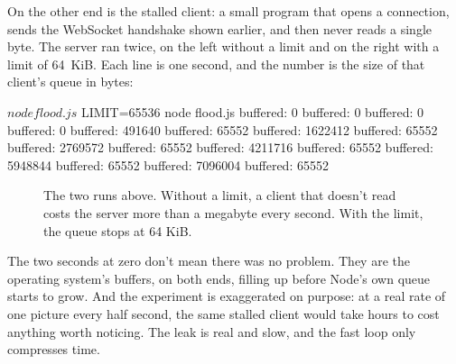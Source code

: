 On the other end is the stalled client: a small program that opens a
connection, sends the WebSocket handshake shown earlier, and then never
reads a single byte. The server ran twice, on the left without a limit and on
the right with a limit of 64~KiB. Each line is one second, and the number is
the size of that client's queue in bytes:

\begin{terminal}
$ node flood.js                    $ LIMIT=65536 node flood.js
buffered: 0                        buffered: 0
buffered: 0                        buffered: 0
buffered: 491640                   buffered: 65552
buffered: 1622412                  buffered: 65552
buffered: 2769572                  buffered: 65552
buffered: 4211716                  buffered: 65552
buffered: 5948844                  buffered: 65552
buffered: 7096004                  buffered: 65552
\end{terminal}

\begin{figure}[htbp]
\centering
{}
\caption{The two runs above. Without a limit, a client that doesn't read costs
the server more than a megabyte every second. With the limit, the queue stops at
64 KiB.}
\end{figure}

The two seconds at zero don't mean there was no problem. They are the operating
system's buffers, on both ends, filling up before Node's own queue starts to
grow. And the experiment is exaggerated on purpose: at a real rate of one
picture every half second, the same stalled client would take hours to cost
anything worth noticing. The leak is real and slow, and the fast loop only
compresses time.

